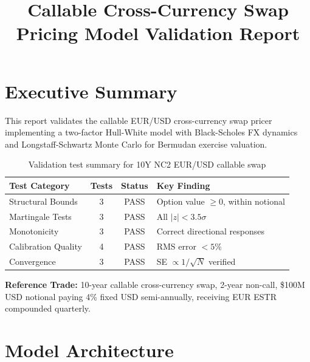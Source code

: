 \documentclass[conference]{IEEEtran}
\title{Callable Cross-Currency Swap Pricing Model Validation Report}
\author{\TGIRArticleAuthorBlock}
\begin{document}
\maketitle

\section{Executive Summary}

This report validates the callable EUR/USD cross-currency swap pricer implementing a two-factor Hull-White model with Black-Scholes FX dynamics and Longstaff-Schwartz Monte Carlo for Bermudan exercise valuation.

\begin{table}[H]
\centering
\begin{tabularx}{\columnwidth}{>{\raggedright\arraybackslash}Xcc>{\raggedright\arraybackslash}X}
\toprule
\textbf{Test Category} & \textbf{Tests} & \textbf{Status} & \textbf{Key Finding} \\
\midrule
Structural Bounds & 3 & \textcolor{pass}{PASS} & Option value $\geq 0$, within notional \\
Martingale Tests & 3 & \textcolor{pass}{PASS} & All $|z| < 3.5\sigma$ \\
Monotonicity & 3 & \textcolor{pass}{PASS} & Correct directional responses \\
Calibration Quality & 4 & \textcolor{pass}{PASS} & RMS error $< 5\%$ \\
Convergence & 3 & \textcolor{pass}{PASS} & SE $\propto 1/\sqrt{N}$ verified \\
\bottomrule
\end{tabularx}
\caption{Validation test summary for 10Y NC2 EUR/USD callable swap}
\end{table}

\textbf{Reference Trade:} 10-year callable cross-currency swap, 2-year non-call, \$100M USD notional paying 4\% fixed USD semi-annually, receiving EUR ESTR compounded quarterly.

\section{Model Architecture}
\end{document}

